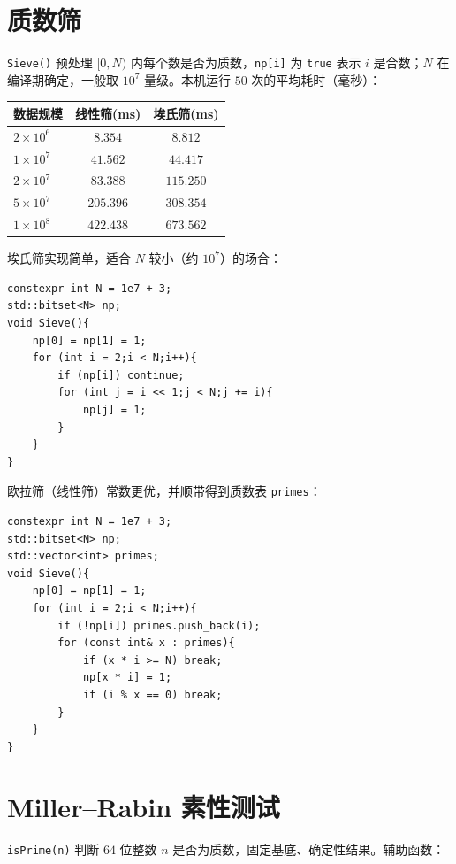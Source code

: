 \section{质数筛}

\verb|Sieve()| 预处理 $[0,N)$ 内每个数是否为质数，\texttt{np[i]} 为 \texttt{true} 表示 $i$ 是合数；$N$ 在编译期确定，一般取 $10^7$ 量级。本机运行 $50$ 次的平均耗时（毫秒）：

\begin{center}
\begin{tabular}{lcc}
\hline
数据规模 & 线性筛(ms) & 埃氏筛(ms) \\
\hline
$2\times 10^6$ & $8.354$ & $8.812$ \\
$1\times 10^7$ & $41.562$ & $44.417$ \\
$2\times 10^7$ & $83.388$ & $115.250$ \\
$5\times 10^7$ & $205.396$ & $308.354$ \\
$1\times 10^8$ & $422.438$ & $673.562$ \\
\hline
\end{tabular}
\end{center}

埃氏筛实现简单，适合 $N$ 较小（约 $10^7$）的场合：

\begin{lstlisting}
constexpr int N = 1e7 + 3;
std::bitset<N> np;
void Sieve(){
    np[0] = np[1] = 1;
    for (int i = 2;i < N;i++){
        if (np[i]) continue;
        for (int j = i << 1;j < N;j += i){
            np[j] = 1;
        }
    }
}
\end{lstlisting}

欧拉筛（线性筛）常数更优，并顺带得到质数表 \texttt{primes}：

\begin{lstlisting}
constexpr int N = 1e7 + 3;
std::bitset<N> np;
std::vector<int> primes;
void Sieve(){
    np[0] = np[1] = 1;
    for (int i = 2;i < N;i++){
        if (!np[i]) primes.push_back(i);
        for (const int& x : primes){
            if (x * i >= N) break;
            np[x * i] = 1;
            if (i % x == 0) break;
        }
    }
}
\end{lstlisting}

\section{Miller--Rabin 素性测试}

\verb|isPrime(n)| 判断 $64$ 位整数 $n$ 是否为质数，固定基底、确定性结果。辅助函数：

